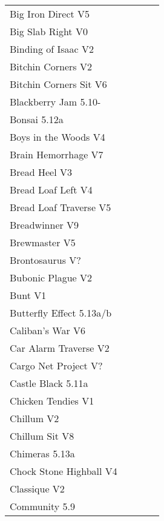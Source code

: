 \begin{flushleft}
\begin{center}
\begin{supertabular}{p{0.76\linewidth}p{0.08\linewidth}}
Big Iron Direct V5 & \pageref{vr:Big Iron Direct} \\
Big Slab Right V0 & \pageref{rt:Big Slab Right} \\
Binding of Isaac V2 & \pageref{rt:Binding of Isaac} \\
Bitchin Corners V2 & \pageref{rt:Bitchin Corners} \\
Bitchin Corners Sit V6 & \pageref{vr:Bitchin Corners Sit} \\
Blackberry Jam 5.10- & \pageref{rt:Blackberry Jam} \\
Bonsai 5.12a & \pageref{rt:Bonsai} \\
Boys in the Woods V4 & \pageref{rt:Boys in the Woods} \\
Brain Hemorrhage V7 & \pageref{vr:Brain Hemorrhage} \\
Bread Heel V3 & \pageref{rt:Bread Heel} \\
Bread Loaf Left V4 & \pageref{rt:Bread Loaf Left} \\
Bread Loaf Traverse V5 & \pageref{rt:Bread Loaf Traverse} \\
Breadwinner V9 & \pageref{rt:Breadwinner} \\
Brewmaster V5 & \pageref{rt:Brewmaster} \\
Brontosaurus V? & \pageref{rt:Brontosaurus} \\
Bubonic Plague V2 & \pageref{rt:Bubonic Plague} \\
Bunt V1 & \pageref{rt:Bunt} \\
Butterfly Effect 5.13a/b & \pageref{rt:Butterfly Effect} \\
Caliban's War V6 & \pageref{rt:Caliban's War} \\
Car Alarm Traverse V2 & \pageref{rt:Car Alarm Traverse} \\
Cargo Net Project V? & \pageref{rt:Cargo Net Project} \\
Castle Black 5.11a & \pageref{rt:Castle Black} \\
Chicken Tendies V1 & \pageref{rt:Chicken Tendies} \\
Chillum V2 & \pageref{rt:Chillum} \\
Chillum Sit V8 & \pageref{vr:Chillum Sit} \\
Chimeras 5.13a & \pageref{rt:Chimeras} \\
Chock Stone Highball V4 & \pageref{rt:Chock Stone Highball} \\
Classique V2 & \pageref{rt:Classique} \\
Community 5.9 & \pageref{rt:Community} \\

\end{supertabular}
\end{center}
\end{flushleft}
